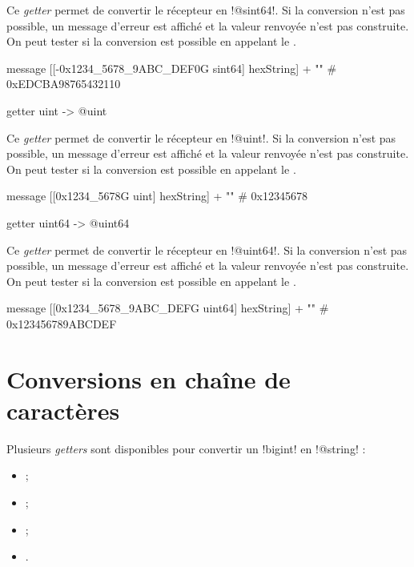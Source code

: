 Ce \emph{getter} permet de convertir le récepteur en \ggs!@sint64!. Si la conversion n'est pas possible, un message d'erreur est affiché et la valeur renvoyée n'est pas construite. On peut tester si la conversion est possible en appelant le .

\begin{galgas}
message [[-0x1234_5678_9ABC_DEF0G sint64] hexString] + "\n" # 0xEDCBA98765432110
\end{galgas}



\begin{galgasbox}
getter uint -> @uint
\end{galgasbox}

Ce \emph{getter} permet de convertir le récepteur en \ggs!@uint!. Si la conversion n'est pas possible, un message d'erreur est affiché et la valeur renvoyée n'est pas construite. On peut tester si la conversion est possible en appelant le .

\begin{galgas}
message [[0x1234_5678G uint] hexString] + "\n" # 0x12345678
\end{galgas}



\begin{galgasbox}
getter uint64 -> @uint64
\end{galgasbox}

Ce \emph{getter} permet de convertir le récepteur en \ggs!@uint64!. Si la conversion n'est pas possible, un message d'erreur est affiché et la valeur renvoyée n'est pas construite. On peut tester si la conversion est possible en appelant le .

\begin{galgas}
message [[0x1234_5678_9ABC_DEFG uint64] hexString] + "\n" # 0x123456789ABCDEF
\end{galgas}







\section{Conversions en chaîne de caractères}

Plusieurs \emph{getters} sont disponibles pour convertir un \ggs!bigint! en \ggs!@string! :
\begin{itemize}
  \item {} ;
  \item {} ;
  \item {} ;
  \item {}.
\end{itemize}

